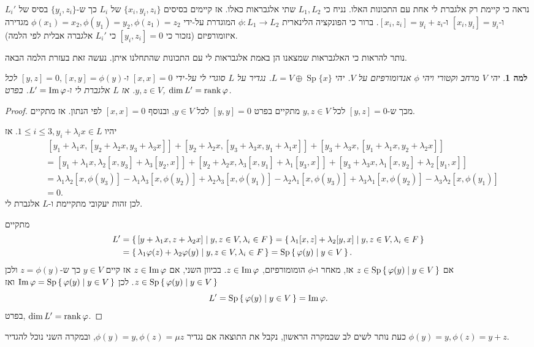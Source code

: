 \documentclass{report}
\makeatletter
\theoremstyle{break}
\newtheorem*{unLemma}{למה}
\theoremstyle{MyNonumberbreak}
\newtheorem{proof}{הוכחה}
\DeclareRobustCommand{\Eqref}[1]{\textup{\tagform@{\ref*{#1}}}}
\DeclareMathOperator{\Sp}{Sp}
\makeatother
\begin{document}
\begin{itemize}
	נראה כי קיימת רק אלגברת לי אחת עם התכונות האלו. נניח כי $L_1, L_2$ שתי אלגבראות כאלו. אז קיימים בסיסים $\{x_i, y_i, z_i\}$ של $L_i$ כך ש-$\{y_i, z_i\}$ בסיס של $L_i'$ ו-$[x_i, y_i] = y_i$ ו-$[x_i, z_i] = y_i + z_i$. ברור כי הפונקציה הלינארית $\phi : L_1 \to L_2$ המוגדרת על-ידי $\phi(x_1) = x_2, \phi(y_1) = y_2, \phi(z_1) = z_2$ מגדירה איזומורפיזם (נזכור כי $[y_i, z_i] = 0$ כי $L_i'$ אלגברה אבלית לפי הלמה).
\end{itemize}
נותר להראות כי האלגבראות שמצאנו הן באמת אלגבראות לי עם התכונות שהתחלנו איתן. נעשה זאת בעזרת הלמה הבאה.
\begin{unLemma}
	יהי $V$ מרחב וקטורי ויהי $\phi$ אנדומורפיזם על $V$. יהי $L = V \oplus \Sp\{x\}$. נגדיר על $L$ סוגרי לי על-ידי $[x, x] = 0$ ו-$[y, z] = 0, [x, y] = \phi(y)$ לכל $y, z \in V$. אז $L$ אלגברת לי ו-$L' = \operatorname{Im}\varphi$. בפרט, $\dim L' = \operatorname{rank}\varphi$. 
\end{unLemma}
\begin{proof}
	מכך ש-$[y, z] = 0$ לכל $y, z \in V$ מתקיים בפרט $[y, y] =0$ לכל $y \in V$, ובנוסף $[x, x] = 0$ לפי הנתון. אז \Eqref{eq:L1} מתקיים. 
	
	יהיו $1 \le i \le 3, y_i + \lambda_i x \in L$. אז
\begin{align*}
	&\; [y_1 + \lambda_1 x, [y_2 + \lambda_2 x, y_3 + \lambda_3 x]] + [y_2 + \lambda_2 x, [y_3 + \lambda_3 x, y_1 + \lambda_1 x]] + [y_3 + \lambda_3 x, [y_1 + \lambda_1 x, y_2 + \lambda_2 x]] \\
		&= [y_1 + \lambda_1 x, \lambda_2 [x, y_3] + \lambda_3 [y_2, x]] + [y_2 + \lambda_2 x, \lambda_3 [x, y_1] + \lambda_1 [y_3, x]] + [y_3 + \lambda_3 x, \lambda_1 [x, y_2] + \lambda_2 [y_1, x]] \\
		&= \lambda_1\lambda_2 [x, \phi(y_3)] - \lambda_1\lambda_3 [x, \phi(y_2)] + \lambda_2\lambda_3 [x, \phi(y_1)] - \lambda_2\lambda_1 [x, \phi(y_3)] + \lambda_3\lambda_1 [x, \phi(y_2)] - \lambda_3\lambda_2 [x, \phi(y_1)] \\
		&= 0.
\end{align*}
לכן זהות יעקובי מתקיימת ו-$L$ אלגברת לי.

מתקיים
\begin{align*}
	L' &= \set{[y + \lambda_1 x, z + \lambda_2 x] | y, z \in V, \lambda_i \in F} = \set{\lambda_1 [x, z] + \lambda_2[y, x] | y, z \in V, \lambda_i \in F} \\
		&= \set{\lambda_1 \phi(z) + \lambda_2 \phi(y) | y, z \in V, \lambda_i \in F} = \Sp\set{\phi(y) | y \in V}.
\end{align*}
אם $z \in \Sp\set{\phi(y) | y \in V}$ אז, מאחר ו-$\phi$ הומומורפיזם, $z \in \operatorname{Im}\varphi$. בכיוון השני, אם $z \in \operatorname{Im}\varphi$ אז קיים $y \in V$ כך ש-$z = \phi(y)$ ולכן $z \in \Sp\set{\phi(y) | y \in V}$. לכן $\Img\phi = \Sp\set{\phi(y) | y \in V}$ ואז
\[ L' = \Sp\set{\phi(y) | y \in V} = \Img\phi. \]
בפרט, $\dim L' = \operatorname{rank}\varphi$.
\end{proof}
כעת נותר לשים לב שבמקרה הראשון, נקבל את התוצאה אם נגדיר $\phi(y) = y, \phi(z) = \mu z$, ובמקרה השני נוכל להגדיר $\phi(y) = y, \phi(z) = y + z$.
\end{document}
